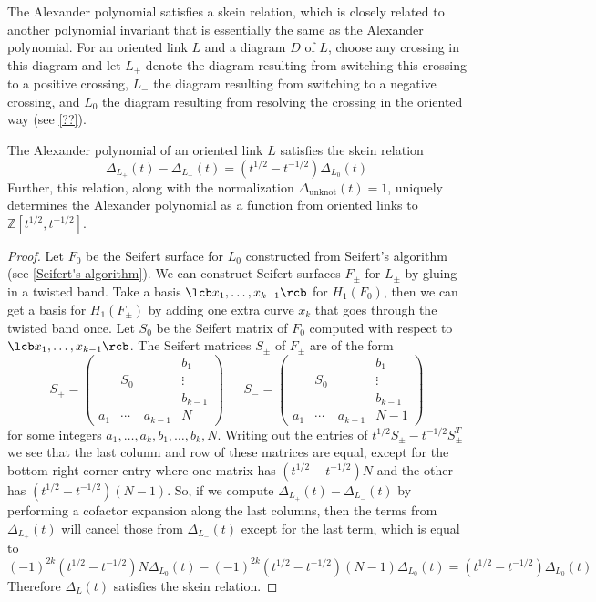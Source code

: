 The Alexander polynomial satisfies a skein relation, which is closely related to another polynomial invariant that is essentially the same as the Alexander polynomial. For an oriented link $L$ and a diagram $D$ of $L$, choose any crossing in this diagram and let $L_+$ denote the diagram resulting from switching this crossing to a positive crossing, $L_-$ the diagram resulting from switching to a negative crossing, and $L_0$ the diagram resulting from resolving the crossing in the oriented way (see \cref{??}). 
\begin{thm}
The Alexander polynomial of an oriented link $L$ satisfies the skein relation
\[ \Delta_{L_+}(t) - \Delta_{L_-}(t) = (t^{1/2}-t^{-1/2}) \Delta_{L_0}(t) \]
Further, this relation, along with the normalization $\Delta_\text{unknot}(t)=1$, uniquely determines the Alexander polynomial as a function from oriented links to $\mathbb Z[t^{1/2},t^{-1/2}]$.
\end{thm}
\begin{proof}
Let $F_0$ be the Seifert surface for $L_0$ constructed from Seifert's algorithm (see \cref{Seifert's algorithm}). We can construct Seifert surfaces $F_\pm$ for $L_\pm$ by gluing in a twisted band. Take a basis $\lcb x_1,\ldots,x_{k-1} \rcb$ for $H_1(F_0)$, then we can get a basis for $H_1(F_\pm)$ by adding one extra curve $x_k$ that goes through the twisted band once. Let $S_0$ be the Seifert matrix of $F_0$ computed with respect to $\lcb x_1,\ldots,x_{k-1} \rcb$. The Seifert matrices $S_\pm$ of $F_\pm$ are of the form
\[ S_+ = \begin{pmatrix} 
			    &        &         & b_1 \\
			    & S_0    &         & \vdots \\
			    &        &         & b_{k-1} \\
			a_1 & \cdots & a_{k-1} & N
		  \end{pmatrix}
\ \ \ \ \ \ \ 
   S_- = \begin{pmatrix} 
			    &        &         & b_1 \\
			    & S_0    &         & \vdots \\
			    &        &         & b_{k-1} \\
			a_1 & \cdots & a_{k-1} & N-1
		  \end{pmatrix}
\]
for some integers $a_1,\ldots,a_k,b_1,\ldots,b_k,N$. Writing out the entries of $t^{1/2}S_\pm - t^{-1/2}S_\pm^T$ we see that the last column and row of these matrices are equal, except for the bottom-right corner entry where one matrix has $(t^{1/2}-t^{-1/2})N$ and the other has $(t^{1/2}-t^{-1/2})(N-1)$. So, if we compute $\Delta_{L_+}(t) - \Delta_{L_-}(t)$ by performing a cofactor expansion along the last columns, then the terms from $\Delta_{L_+}(t)$ will cancel those from $\Delta_{L_-}(t)$ except for the last term, which is equal to
\[ (-1)^{2k} (t^{1/2}-t^{-1/2})N \Delta_{L_0}(t) - (-1)^{2k} (t^{1/2}-t^{-1/2})(N-1) \Delta_{L_0}(t) = (t^{1/2}-t^{-1/2}) \Delta_{L_0}(t)   \]
Therefore $\Delta_L(t)$ satisfies the skein relation. 
\end{proof}

